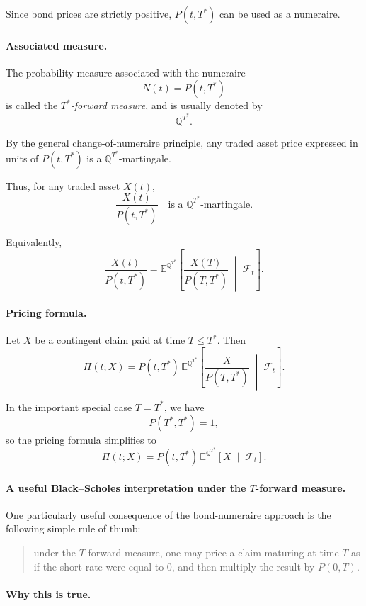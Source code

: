 \documentclass[11pt]{article}
\newcommand{\Qbb}{\mathbb{Q}}
\newcommand{\E}{\mathbb{E}}
\theoremstyle{definition}
\theoremstyle{plain}
\begin{document}
Since bond prices are strictly positive, \(P(t,T^\ast)\) can be used as
a numeraire.

\paragraph{Associated measure.}
The probability measure associated with the numeraire
\[
N(t)=P(t,T^\ast)
\]
is called the \emph{\(T^\ast\)-forward measure}, and is usually denoted
by
\[
\Qbb^{T^\ast}.
\]

By the general change-of-numeraire principle, any traded asset price
expressed in units of \(P(t,T^\ast)\) is a \(\Qbb^{T^\ast}\)-martingale.

Thus, for any traded asset \(X(t)\),
\[
\frac{X(t)}{P(t,T^\ast)}
\quad\text{is a }\Qbb^{T^\ast}\text{-martingale.}
\]

Equivalently,
\[
\frac{X(t)}{P(t,T^\ast)}
=
\E^{\Qbb^{T^\ast}}\!\left[
\frac{X(T)}{P(T,T^\ast)}
\;\middle|\;
\mathcal{F}_t
\right].
\]

\paragraph{Pricing formula.}
Let \(X\) be a contingent claim paid at time \(T\leq T^\ast\).
Then
\[
\Pi(t;X)
=
P(t,T^\ast)\,
\E^{\Qbb^{T^\ast}}\!\left[
\frac{X}{P(T,T^\ast)}
\;\middle|\;
\mathcal{F}_t
\right].
\]

In the important special case \(T=T^\ast\), we have
\[
P(T^\ast,T^\ast)=1,
\]
so the pricing formula simplifies to
\[
\boxed{
\Pi(t;X)
=
P(t,T^\ast)\,
\E^{\Qbb^{T^\ast}}\!\left[
X
\;\middle|\;
\mathcal{F}_t
\right].
}
\]


\paragraph{A useful Black--Scholes interpretation under the \(T\)-forward measure.}

One particularly useful consequence of the bond-numeraire approach is
the following simple rule of thumb:

\begin{quote}
under the \(T\)-forward measure, one may price a claim maturing at time
\(T\) as if the short rate were equal to \(0\), and then multiply the
result by \(P(0,T)\).
\end{quote}

\paragraph{Why this is true.}
\end{document}
